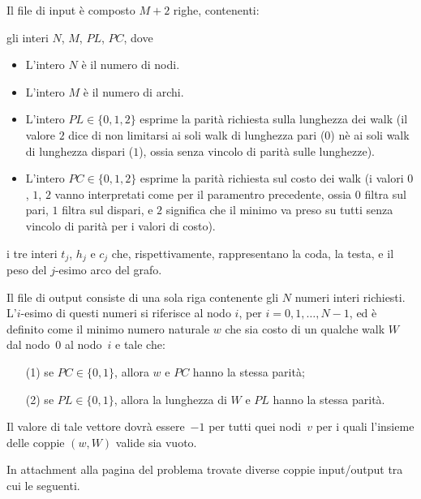 Il file di input è composto $M+2$ righe, contenenti:
\begin{description}[nolistsep,itemsep=2mm]
\item [Riga $1$:] gli interi $N$, $M$, $PL$, $PC$, dove

\begin{itemize}[nolistsep]
	\item L'intero $N$ è il numero di nodi.
	\item L'intero $M$ è il numero di archi.
	\item L'intero $PL\in \{0,1,2\}$ esprime la parità richiesta sulla lunghezza dei walk (il valore $2$ dice di non limitarsi ai soli walk di lunghezza pari ($0$) nè ai soli walk di lunghezza dispari ($1$), ossia senza vincolo di parità sulle lunghezze).
	\item L'intero $PC\in \{0,1,2\}$ esprime la parità richiesta sul costo dei walk (i valori $0$, $1$, $2$ vanno interpretati come per il paramentro precedente, ossia $0$ filtra sul pari, $1$ filtra sul dispari, e $2$ significa che il minimo va preso su tutti senza vincolo di parità per i valori di costo).
\end{itemize}
\item [Righe $2, \dots, M+1$:] i tre interi $t_j$, $h_j$ e $c_j$ che, rispettivamente, rappresentano la coda, la testa, e il peso del $j$-esimo arco del grafo.
\end{description}

\medskip

Il file di output consiste di una sola riga contenente gli $N$ numeri interi richiesti. L'$i$-esimo di questi numeri si riferisce al nodo $i$, per $i=0,1,\ldots, N-1$, ed è definito come il minimo numero naturale $w$ che sia costo di un qualche walk $W$ dal nodo~$0$ al nodo~$i$ e tale che:
\begin{itemize}
  \item[(1)] se $PC \in \{0,1\}$, allora $w$ e $PC$ hanno la stessa parità;
  \item[(2)] se $PL \in \{0,1\}$, allora la lunghezza di $W$ e $PL$ hanno la stessa parità.
\end{itemize}
Il valore di tale vettore dovrà essere~$-1$ per tutti quei nodi~$v$ per i quali l'insieme delle coppie $(w,W)$ valide sia vuoto.



\newpage


In attachment alla pagina del problema trovate diverse coppie input/output tra cui le seguenti.


